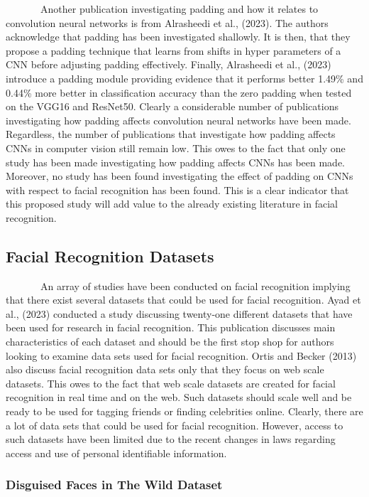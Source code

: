 \documentclass[
  12pt,
]{article}
\begin{document}
~~~~~~~Another publication investigating padding and how it relates to
convolution neural networks is from Alrasheedi et al., (2023). The
authors acknowledge that padding has been investigated shallowly. It is
then, that they propose a padding technique that learns from shifts in
hyper parameters of a CNN before adjusting padding effectively. Finally,
Alrasheedi et al., (2023) introduce a padding module providing evidence
that it performs better 1.49\% and 0.44\% more better in classification
accuracy than the zero padding when tested on the VGG16 and ResNet50.
Clearly a considerable number of publications investigating how padding
affects convolution neural networks have been made. Regardless, the
number of publications that investigate how padding affects CNNs in
computer vision still remain low. This owes to the fact that only one
study has been made investigating how padding affects CNNs has been
made. Moreover, no study has been found investigating the effect of
padding on CNNs with respect to facial recognition has been found. This
is a clear indicator that this proposed study will add value to the
already existing literature in facial recognition.

\subsection{Facial Recognition
Datasets}\label{facial-recognition-datasets}

~~~~~~~An array of studies have been conducted on facial recognition
implying that there exist several datasets that could be used for facial
recognition. Ayad et al., (2023) conducted a study discussing twenty-one
different datasets that have been used for research in facial
recognition. This publication discusses main characteristics of each
dataset and should be the first stop shop for authors looking to examine
data sets used for facial recognition. Ortis and Becker (2013) also
discuss facial recognition data sets only that they focus on web scale
datasets. This owes to the fact that web scale datasets are created for
facial recognition in real time and on the web. Such datasets should
scale well and be ready to be used for tagging friends or finding
celebrities online. Clearly, there are a lot of data sets that could be
used for facial recognition. However, access to such datasets have been
limited due to the recent changes in laws regarding access and use of
personal identifiable information.

\subsubsection{Disguised Faces in The Wild
Dataset}\label{disguised-faces-in-the-wild-dataset}
\end{document}
